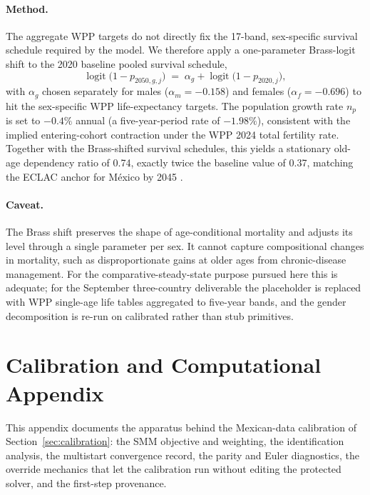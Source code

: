 \documentclass[12pt,a4paper]{article}
\begin{document}
\begin{appendices}
\paragraph{Method.} The aggregate WPP targets do not directly fix the 17-band, sex-specific survival schedule required by the model. We therefore apply a one-parameter Brass-logit shift to the 2020 baseline pooled survival schedule,
\begin{equation}
\label{eq:brass_logit}
\operatorname{logit}\bigl(1 - p_{2050, g, j}\bigr) \;=\; \alpha_g + \operatorname{logit}\bigl(1 - p_{2020, j}\bigr),
\end{equation}
with $\alpha_g$ chosen separately for males ($\alpha_m = -0.158$) and females ($\alpha_f = -0.696$) to hit the sex-specific WPP life-expectancy targets. The population growth rate $n_p$ is set to $-0.4\%$ annual (a five-year-period rate of $-1.98\%$), consistent with the implied entering-cohort contraction under the WPP 2024 total fertility rate. Together with the Brass-shifted survival schedules, this yields a stationary old-age dependency ratio of 0.74, exactly twice the baseline value of 0.37, matching the ECLAC anchor for M\'exico by 2045 \citep{ECLAC2022}.

\paragraph{Caveat.} The Brass shift preserves the shape of age-conditional mortality and adjusts its level through a single parameter per sex. It cannot capture compositional changes in mortality, such as disproportionate gains at older ages from chronic-disease management. For the comparative-steady-state purpose pursued here this is adequate; for the September three-country deliverable the placeholder is replaced with WPP single-age life tables aggregated to five-year bands, and the gender decomposition is re-run on calibrated rather than stub primitives.

\section{Calibration and Computational Appendix}
\label{app:calibration}

This appendix documents the apparatus behind the Mexican-data calibration of Section~\ref{sec:calibration}: the SMM objective and weighting, the identification analysis, the multistart convergence record, the parity and Euler diagnostics, the override mechanics that let the calibration run without editing the protected solver, and the first-step provenance.


\end{appendices}
\end{document}
